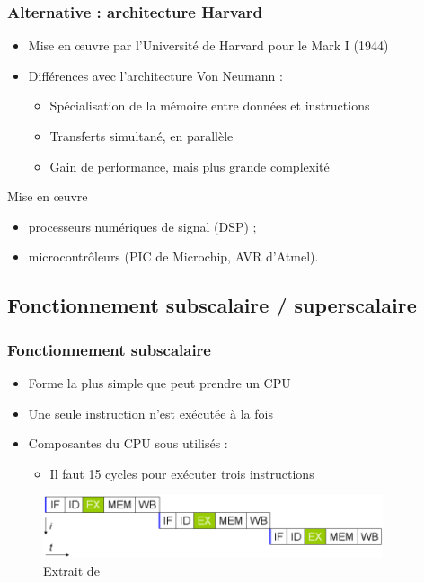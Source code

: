 \begin{frame}
\frametitle{Alternative : architecture Harvard \cite{wp-harvard}}
\begin{itemize}
\item Mise en œuvre par l'Université de Harvard pour le Mark I (1944)
\item Différences avec l'architecture Von Neumann :
\begin{itemize}
\item Spécialisation de la mémoire entre données et instructions
\item Transferts simultané, en parallèle
\item Gain de performance, mais plus grande complexité
\end{itemize}
\end{itemize}
\begin{exampleblock}{Mise en œuvre}
\begin{itemize}
\item processeurs numériques de signal (DSP) ;
\item microcontrôleurs (PIC de Microchip, AVR d'Atmel).
\end{itemize}

\end{exampleblock}

\end{frame}


\subsection{Fonctionnement subscalaire / superscalaire}

\begin{frame}
\frametitle{Fonctionnement subscalaire}
\begin{itemize}
\item  Forme la plus simple que peut prendre un CPU
\item Une seule instruction n'est exécutée à la fois
\item Composantes du CPU sous utilisés :
\begin{itemize}
\item Il faut 15 cycles pour exécuter trois instructions
\end{itemize}
\end{itemize}
\begin{figure}
\includegraphics[width=10cm]{../illustration/processeur-fonc_subscalaire.png}
\caption{Extrait de \cite{wp-cpu}}
\end{figure}
\end{frame}


